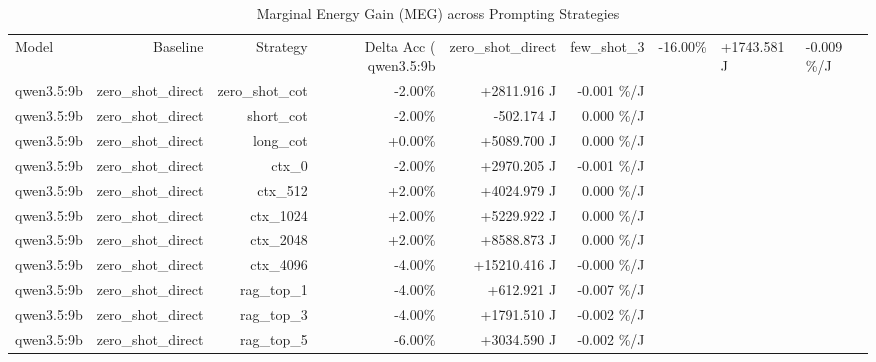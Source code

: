 \begin{table}[t]
\centering
\small
\begin{tabular}{lrrrrr}
\toprule
Model & Baseline & Strategy & Delta Acc (%
\midrule
qwen3.5:9b & zero\_shot\_direct & few\_shot\_3 & -16.00\% & +1743.581 J & -0.009 \%/J \\
qwen3.5:9b & zero\_shot\_direct & zero\_shot\_cot & -2.00\% & +2811.916 J & -0.001 \%/J \\
qwen3.5:9b & zero\_shot\_direct & short\_cot & -2.00\% & -502.174 J & 0.000 \%/J \\
qwen3.5:9b & zero\_shot\_direct & long\_cot & +0.00\% & +5089.700 J & 0.000 \%/J \\
qwen3.5:9b & zero\_shot\_direct & ctx\_0 & -2.00\% & +2970.205 J & -0.001 \%/J \\
qwen3.5:9b & zero\_shot\_direct & ctx\_512 & +2.00\% & +4024.979 J & 0.000 \%/J \\
qwen3.5:9b & zero\_shot\_direct & ctx\_1024 & +2.00\% & +5229.922 J & 0.000 \%/J \\
qwen3.5:9b & zero\_shot\_direct & ctx\_2048 & +2.00\% & +8588.873 J & 0.000 \%/J \\
qwen3.5:9b & zero\_shot\_direct & ctx\_4096 & -4.00\% & +15210.416 J & -0.000 \%/J \\
qwen3.5:9b & zero\_shot\_direct & rag\_top\_1 & -4.00\% & +612.921 J & -0.007 \%/J \\
qwen3.5:9b & zero\_shot\_direct & rag\_top\_3 & -4.00\% & +1791.510 J & -0.002 \%/J \\
qwen3.5:9b & zero\_shot\_direct & rag\_top\_5 & -6.00\% & +3034.590 J & -0.002 \%/J \\
\bottomrule
\end{tabular}
\caption{Marginal Energy Gain (MEG) across Prompting Strategies}
\label{tab:3_marginal_energy_gain}
\end{table}
